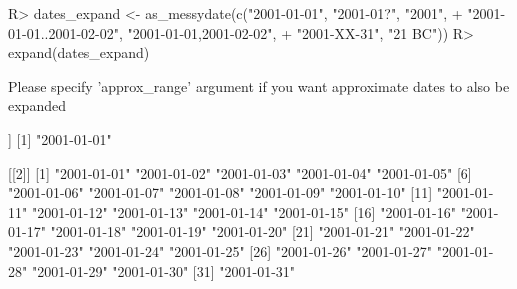 \documentclass[
]{jss}
\begin{document}
\begin{CodeChunk}
\begin{CodeInput}
R> dates_expand <- as_messydate(c("2001-01-01", "2001-01?", "2001",
+                                "2001-01-01..2001-02-02", "{2001-01-01,2001-02-02}",
+                                "2001-XX-31", "21 BC"))
R> expand(dates_expand)
\end{CodeInput}
\begin{CodeOutput}
Please specify 'approx_range' argument if you want approximate dates to also be expanded
\end{CodeOutput}
\begin{CodeOutput}
[[1]]
[1] "2001-01-01"

[[2]]
 [1] "2001-01-01" "2001-01-02" "2001-01-03" "2001-01-04" "2001-01-05"
 [6] "2001-01-06" "2001-01-07" "2001-01-08" "2001-01-09" "2001-01-10"
[11] "2001-01-11" "2001-01-12" "2001-01-13" "2001-01-14" "2001-01-15"
[16] "2001-01-16" "2001-01-17" "2001-01-18" "2001-01-19" "2001-01-20"
[21] "2001-01-21" "2001-01-22" "2001-01-23" "2001-01-24" "2001-01-25"
[26] "2001-01-26" "2001-01-27" "2001-01-28" "2001-01-29" "2001-01-30"
[31] "2001-01-31"


\end{CodeOutput}
\end{CodeChunk}
\end{document}
